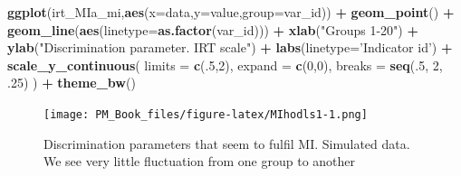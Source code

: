 \documentclass[]{book}
\newenvironment{Shaded}{\begin{snugshade}}{\end{snugshade}}
\newcommand{\DataTypeTok}[1]{\textcolor[rgb]{0.13,0.29,0.53}{#1}}
\newcommand{\DecValTok}[1]{\textcolor[rgb]{0.00,0.00,0.81}{#1}}
\newcommand{\FloatTok}[1]{\textcolor[rgb]{0.00,0.00,0.81}{#1}}
\newcommand{\KeywordTok}[1]{\textcolor[rgb]{0.13,0.29,0.53}{\textbf{#1}}}
\newcommand{\NormalTok}[1]{#1}
\newcommand{\OperatorTok}[1]{\textcolor[rgb]{0.81,0.36,0.00}{\textbf{#1}}}
\newcommand{\StringTok}[1]{\textcolor[rgb]{0.31,0.60,0.02}{#1}}
\begin{document}
\begin{Shaded}
\begin{Highlighting}[]
\KeywordTok{ggplot}\NormalTok{(irt_MIa_mi,}\KeywordTok{aes}\NormalTok{(}\DataTypeTok{x=}\NormalTok{data,}\DataTypeTok{y=}\NormalTok{value,}\DataTypeTok{group=}\NormalTok{var_id)) }\OperatorTok{+}\StringTok{ }\KeywordTok{geom_point}\NormalTok{()  }\OperatorTok{+}\StringTok{ }
\StringTok{  }\KeywordTok{geom_line}\NormalTok{(}\KeywordTok{aes}\NormalTok{(}\DataTypeTok{linetype=}\KeywordTok{as.factor}\NormalTok{(var_id))) }\OperatorTok{+}\StringTok{ }
\StringTok{  }\KeywordTok{xlab}\NormalTok{(}\StringTok{"Groups 1-20"}\NormalTok{) }\OperatorTok{+}\StringTok{ }\KeywordTok{ylab}\NormalTok{(}\StringTok{"Discrimination parameter. IRT scale"}\NormalTok{) }\OperatorTok{+}\StringTok{ }
\StringTok{  }\KeywordTok{labs}\NormalTok{(}\DataTypeTok{linetype=}\StringTok{'Indicator id'}\NormalTok{) }\OperatorTok{+}\StringTok{  }
\StringTok{  }\KeywordTok{scale_y_continuous}\NormalTok{( }\DataTypeTok{limits =} \KeywordTok{c}\NormalTok{(.}\DecValTok{5}\NormalTok{,}\DecValTok{2}\NormalTok{), }\DataTypeTok{expand =} \KeywordTok{c}\NormalTok{(}\DecValTok{0}\NormalTok{,}\DecValTok{0}\NormalTok{), }\DataTypeTok{breaks =} \KeywordTok{seq}\NormalTok{(.}\DecValTok{5}\NormalTok{, }\DecValTok{2}\NormalTok{, }\FloatTok{.25}\NormalTok{) ) }\OperatorTok{+}\StringTok{ }
\StringTok{  }\KeywordTok{theme_bw}\NormalTok{() }
\end{Highlighting}
\end{Shaded}

\begin{figure}
\centering
\texttt{[image: PM\_Book\_files/figure-latex/MIhodls1-1.png]}
\caption{\label{fig:MIhodls1}Discrimination parameters that seem to fulfil MI. Simulated data. We see very little fluctuation from one group to another}
\end{figure}
\end{document}
